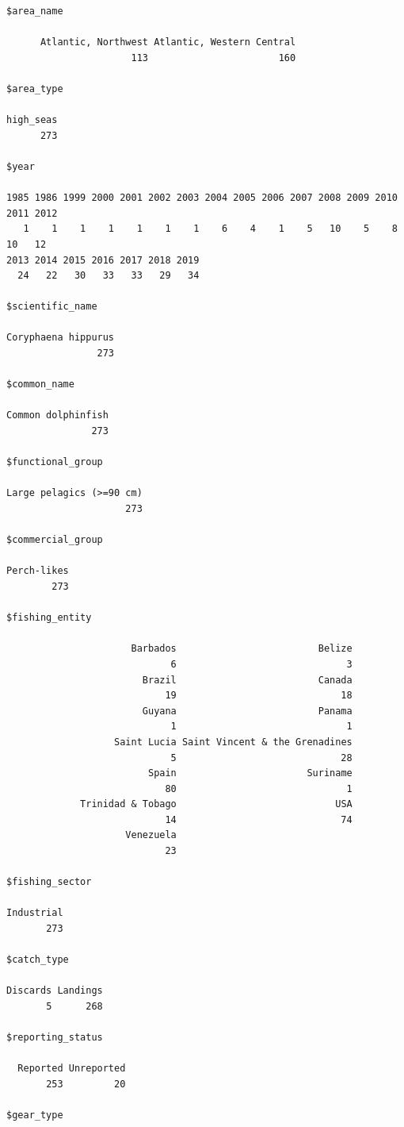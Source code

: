 \documentclass[
  letterpaper,
  oneside,
  open=any]{scrbook}
\begin{document}
\begin{verbatim}
$area_name

      Atlantic, Northwest Atlantic, Western Central 
                      113                       160 

$area_type

high_seas 
      273 

$year

1985 1986 1999 2000 2001 2002 2003 2004 2005 2006 2007 2008 2009 2010 2011 2012 
   1    1    1    1    1    1    1    6    4    1    5   10    5    8   10   12 
2013 2014 2015 2016 2017 2018 2019 
  24   22   30   33   33   29   34 

$scientific_name

Coryphaena hippurus 
                273 

$common_name

Common dolphinfish 
               273 

$functional_group

Large pelagics (>=90 cm) 
                     273 

$commercial_group

Perch-likes 
        273 

$fishing_entity

                      Barbados                         Belize 
                             6                              3 
                        Brazil                         Canada 
                            19                             18 
                        Guyana                         Panama 
                             1                              1 
                   Saint Lucia Saint Vincent & the Grenadines 
                             5                             28 
                         Spain                       Suriname 
                            80                              1 
             Trinidad & Tobago                            USA 
                            14                             74 
                     Venezuela 
                            23 

$fishing_sector

Industrial 
       273 

$catch_type

Discards Landings 
       5      268 

$reporting_status

  Reported Unreported 
       253         20 

$gear_type


\end{verbatim}
\end{document}
